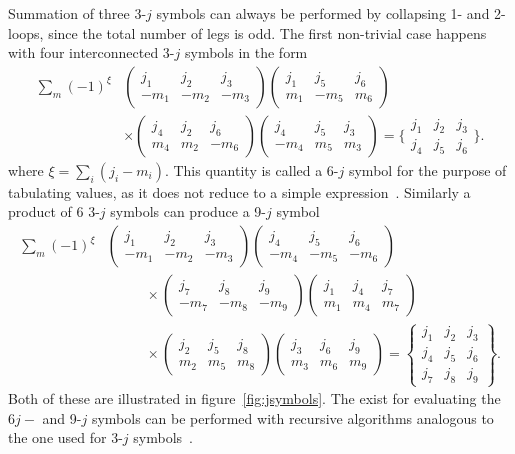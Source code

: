 Summation of three 3-$j$ symbols can always be performed by collapsing 1- and 2-loops, since the total number of legs is odd. The first non-trivial case happens with four interconnected 3-$j$ symbols in the form
\begin{align}\label{6j}
   \sum_m(-1)^\xi&\left(\begin{matrix}j_1&j_2&j_3\\-m_1&-m_2&-m_3\end{matrix}\right)\left(\begin{matrix}j_1&j_5&j_6\\m_1&-m_5&m_6\end{matrix}\right) \nonumber\\
   &\times\left(\begin{matrix}j_4&j_2&j_6\\m_4&m_2&-m_6\end{matrix}\right)\left(\begin{matrix}j_4&j_5&j_3\\-m_4&m_5&m_3\end{matrix}\right) =  \bigg\{\begin{matrix}j_1&j_2&j_3\\j_4&j_5&j_6\end{matrix}\bigg\}.
\end{align}
where $\xi = \sum_i (j_i-m_i)$. This quantity is called a 6-$j$ symbol for the purpose of tabulating values, as it does not reduce to a simple expression~\cite{biedenharn1984angular}. Similarly a product of 6 3-$j$ symbols can produce a 9-$j$ symbol
\begin{align}\label{9j}
   \sum_m(-1)^\xi&\left(\begin{matrix}j_1&j_2&j_3\\-m_1&-m_2&-m_3\end{matrix}\right)\left(\begin{matrix}j_4&j_5&j_6\\-m_4&-m_5&-m_6\end{matrix}\right) \nonumber\\
   &\mspace{50mu}\times\left(\begin{matrix}j_7&j_8&j_9\\-m_7&-m_8&-m_9\end{matrix}\right)\left(\begin{matrix}j_1&j_4&j_7\\m_1&m_4&m_7\end{matrix}\right) \nonumber
   \\
   &\mspace{50mu}\times\left(\begin{matrix}j_2&j_5&j_8\\m_2&m_5&m_8\end{matrix}\right)\left(\begin{matrix}j_3&j_6&j_9\\m_3&m_6&m_9\end{matrix}\right) =  \left\{\begin{matrix}j_1&j_2&j_3\\j_4&j_5&j_6\\j_7&j_8&j_9\end{matrix}\right\}.
\end{align}
Both of these are illustrated in figure~\ref{fig:jsymbols}. The exist  for evaluating the $6j-$ and 9-$j$ symbols can be performed with recursive algorithms analogous to the one used for 3-$j$ symbols~\cite{jsymbolsRef}.

